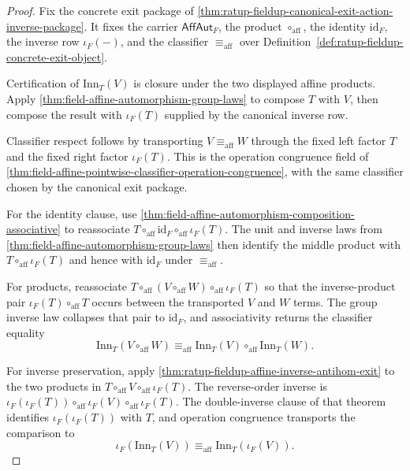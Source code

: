 \begin{proof}
Fix the concrete exit package of
\autoref{thm:ratup-fieldup-canonical-exit-action-inverse-package}. It fixes the
carrier $\mathsf{AffAut}_F$, the product $\circ_{\mathrm{aff}}$, the identity
$\mathrm{id}_F$, the inverse row $\iota_F(-)$, and the classifier
$\equiv_{\mathrm{aff}}$ over
Definition~\ref{def:ratup-fieldup-concrete-exit-object}.

Certification of $\mathrm{Inn}_T(V)$ is closure under the two displayed affine
products. Apply \autoref{thm:field-affine-automorphism-group-laws} to compose
$T$ with $V$, then compose the result with $\iota_F(T)$ supplied by the
canonical inverse row.

Classifier respect follows by transporting $V\equiv_{\mathrm{aff}}W$ through
the fixed left factor $T$ and the fixed right factor $\iota_F(T)$. This is the
operation congruence field of
\autoref{thm:field-affine-pointwise-classifier-operation-congruence}, with the
same classifier chosen by the canonical exit package.

For the identity clause, use
\autoref{thm:field-affine-automorphism-composition-associative} to reassociate
$T\circ_{\mathrm{aff}}\mathrm{id}_F\circ_{\mathrm{aff}}\iota_F(T)$. The unit
and inverse laws from
\autoref{thm:field-affine-automorphism-group-laws} then identify the middle
product with $T\circ_{\mathrm{aff}}\iota_F(T)$ and hence with
$\mathrm{id}_F$ under $\equiv_{\mathrm{aff}}$.

For products, reassociate
$T\circ_{\mathrm{aff}}(V\circ_{\mathrm{aff}}W)\circ_{\mathrm{aff}}\iota_F(T)$
so that the inverse-product pair
$\iota_F(T)\circ_{\mathrm{aff}}T$ occurs between the transported $V$ and $W$
terms. The group inverse law collapses that pair to $\mathrm{id}_F$, and
associativity returns the classifier equality
$$
\mathrm{Inn}_T(V\circ_{\mathrm{aff}}W)\equiv_{\mathrm{aff}}
\mathrm{Inn}_T(V)\circ_{\mathrm{aff}}\mathrm{Inn}_T(W).
$$

For inverse preservation, apply
\autoref{thm:ratup-fieldup-affine-inverse-antihom-exit} to the two products in
$T\circ_{\mathrm{aff}}V\circ_{\mathrm{aff}}\iota_F(T)$. The reverse-order
inverse is
$\iota_F(\iota_F(T))\circ_{\mathrm{aff}}\iota_F(V)\circ_{\mathrm{aff}}\iota_F(T)$.
The double-inverse clause of that theorem identifies $\iota_F(\iota_F(T))$
with $T$, and operation congruence transports the comparison to
$$
\iota_F(\mathrm{Inn}_T(V))\equiv_{\mathrm{aff}}
\mathrm{Inn}_T(\iota_F(V)).
$$
\end{proof}

